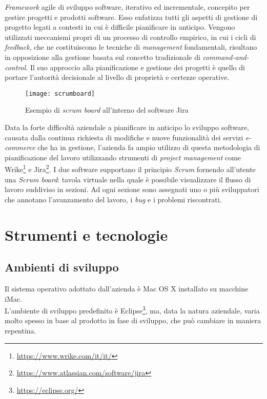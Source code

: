 \textit{Framework} agile di sviluppo software, iterativo ed incrementale, concepito per gestire progetti e prodotti software. Esso enfatizza tutti gli aspetti di gestione di progetto legati a contesti in cui è difficile pianificare in anticipo. Vengono utilizzati meccanismi propri di un processo di controllo empirico, in cui i cicli di \textit{feedback}, che ne costituiscono le tecniche di \textit{management} fondamentali, risultano in opposizione alla gestione basata sul concetto tradizionale di \textit{command-and-control}. Il suo approccio alla pianificazione e gestione dei progetti è quello di portare l'autorità decisionale al livello di proprietà e certezze operative.

\label{Scrum board}
\begin{figure}[ht]
	\begin{center}
		\texttt{[image: scrumboard]}
		\caption{Esempio di \textit{scrum board} all'interno del software Jira}
	\end{center}
\end{figure}
\FloatBarrier

Data la forte difficoltà aziendale a pianificare in anticipo lo sviluppo software, causata dalla continua richiesta di modifiche e nuove funzionalità dei servizi \textit{e-commerce} che ha in gestione, l'azienda fa ampio utilizzo di questa metodologia di pianificazione del lavoro utilizzando strumenti di \textit{project management} come Wrike\footnote[4]{\url{https://www.wrike.com/it/it/}} e Jira\footnote[5]{\url{https://www.atlassian.com/software/jira}}. I due software supportano il principio \textit{Scrum} fornendo all'utente una \textit{Scrum board}: tavola virtuale nella quale è possibile visualizzare il flusso di lavoro suddiviso in sezioni. Ad ogni sezione sono assegnati uno o più sviluppatori che annotano l'avanzamento del lavoro, i \textit{bug} e i problemi riscontrati. 

\section{Strumenti e tecnologie}

\subsection{Ambienti di sviluppo}

Il sistema operativo adottato dall'azienda è Mac OS X installato su macchine iMac. \\
L'ambiente di sviluppo predefinito è Eclipse\footnote[6]{\url{https://eclipse.org/}}, ma, data la natura aziendale, varia molto spesso in base al prodotto in fase di sviluppo, che può cambiare in maniera repentina. 

